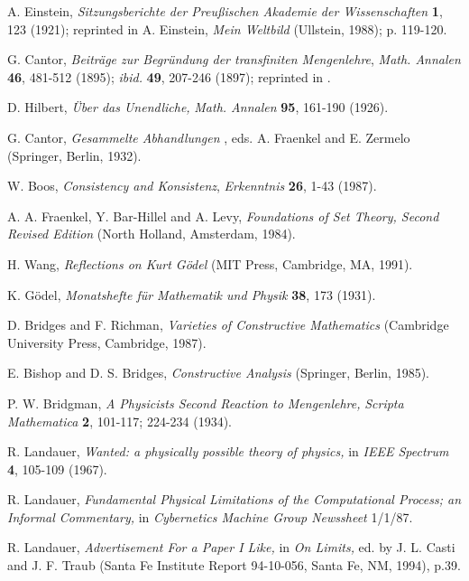 \begin{thebibliography}{99}

 A. Einstein, {\sl Sitzungsberichte der Preu\ss ischen Akademie der
 Wissenschaften} {\bf 1}, 123 (1921); reprinted in A. Einstein, {\sl
Mein Weltbild} (Ullstein, 1988); p. 119-120.


 G. Cantor,
{\sl Beitr\"age zur Begr\"undung der transfiniten Mengenlehre},
{\sl Math. Annalen} {\bf 46}, 481-512 (1895);
{\it ibid.} {\bf 49}, 207-246 (1897); reprinted in
 \cite{cantor}.

D. Hilbert,
{\sl \"Uber das Unendliche,}
{\sl Math. Annalen} {\bf 95}, 161-190 (1926).

 G. Cantor, {\sl Gesammelte Abhandlungen} , eds. A. Fraenkel and E.
 Zermelo (Springer, Berlin, 1932).

W. Boos, {\it Consistency and Konsistenz},
{\sl Erkenntnis} {\bf 26}, 1-43 (1987).

A. A. Fraenkel, Y. Bar-Hillel and A. Levy,
{\sl Foundations of Set Theory, Second Revised Edition}
(North Holland, Amsterdam, 1984).

H. Wang,
{\sl Reflections on Kurt G\"odel}
(MIT Press, Cambridge, MA, 1991).

K. G\"odel, {\sl Monatshefte f\"ur Mathematik und Physik}
{\bf 38}, 173 (1931).

D. Bridges and F. Richman,
{\sl Varieties of Constructive Mathematics}
(Cambridge University Press, Cambridge, 1987).

 E. Bishop and D. S. Bridges, {\sl Constructive Analysis} (Springer,
 Berlin, 1985).


P. W. Bridgman,
{\sl A Physicists Second Reaction to
Mengenlehre,}
{\sl Scripta Mathematica} {\bf 2}, 101-117; 224-234 (1934).


R. Landauer,
{\sl Wanted: a physically possible theory of physics,} in
{\sl IEEE Spectrum} {\bf 4}, 105-109 (1967).

R. Landauer,
{\sl Fundamental Physical Limitations of the Computational Process; an
Informal Commentary,} in
{\sl Cybernetics Machine Group Newssheet} 1/1/87.

R. Landauer,
{\sl Advertisement For a Paper I Like,}
in {\sl On Limits,} ed. by J. L. Casti and J. F. Traub
(Santa Fe Institute Report 94-10-056, Santa Fe, NM, 1994), p.39.


\end{thebibliography}
